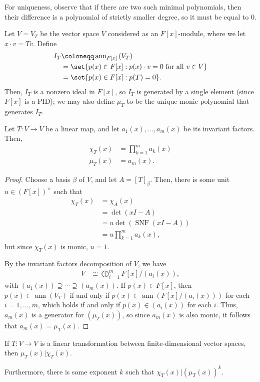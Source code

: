 \documentclass[10pt]{mypackage}
\renewcommand{\coloneq}{\coloneqq}
\begin{document}
For uniqueness, observe that if there are two such minimal polynomials, then their difference is a polynomial of strictly smaller degree, so it must be equal to $0$.
\begin{definition}
  Let $V = V_T$ be the vector space $V$ considered as an $F[x]$-module, where we let $x\cdot v = Tv$. Define
  \begin{align*}
    I_T &\coloneq \operatorname{ann}_{F[x]} \left( V_T \right)\\
        &= \set{p(x)\in F[x] : p(x)\cdot v = 0\text{ for all }v\in V}\\
        &= \set{p(x)\in F[x] : p(T) = 0}.
  \end{align*}
  Then, $I_T$ is a nonzero ideal in $F[x]$, so $I_T$ is generated by a single element (since $F[x]$ is a PID); we may also define $\mu_T$ to be the unique monic polynomial that generates $I_T$.
\end{definition}
\begin{theorem}
  Let $T\colon V\rightarrow V$ be a linear map, and let $a_1(x),\dots,a_m(x)$ be its invariant factors. Then,
  \begin{align*}
    \chi_T(x) &= \prod_{k=1}^{m} a_k(x)\\
    \mu_T(x) &= a_m(x).
  \end{align*}
\end{theorem}
\begin{proof}
  Choose a basis $\beta$ of $V$, and let $A = \left[ T \right]_{\beta}$. Then, there is some unit $u\in \left( F[x] \right)^{\times}$ such that
  \begin{align*}
    \chi_T(x) &= \chi_A(x)\\
              &= \det\left( xI - A \right)\\
              &= u \det\left( \operatorname{SNF}\left( xI - A \right) \right)\\
              &= u \prod_{k=1}^{m}a_k(x),
  \end{align*}
  but since $\chi_T(x)$ is monic, $u = 1$.

  By the invariant factors decomposition of $V$, we have
  \begin{align*}
    V &\cong \bigoplus_{i=1}^{m} F[x]/\left( a_i(x) \right),
  \end{align*}
  with $\left( a_1(x) \right)\supseteq\cdots\supseteq \left( a_m(x) \right)$. If $p(x)\in F[x]$, then $p(x)\in \operatorname{ann}\left(V_T\right)$ if and only if $p(x)\in \operatorname{ann}\left( F[x]/\left( a_i(x) \right) \right)$ for each $i=1,\dots,m$, which holds if and only if $p(x)\in \left( a_i(x) \right)$ for each $i$. Thus, $a_m(x)$ is a generator for $\left( \mu_T(x) \right)$, so since $a_m(x)$ is also monic, it follows that $a_m(x) = \mu_T(x)$.
\end{proof}
\begin{corollary}
  If $T\colon V\rightarrow V$ is a linear transformation between finite-dimensional vector spaces, then $\mu_T(x) | \chi_T(x)$.

  Furthermore, there is some exponent $k$ such that $\chi_T(x) | \left( \mu_T(x) \right)^{k}$.
\end{corollary}
\end{document}
